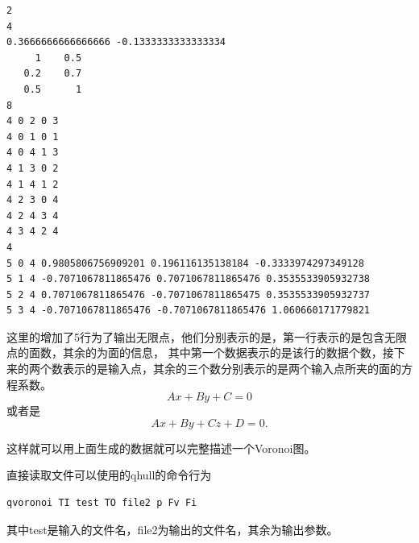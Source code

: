 \begin{verbatim}
2
4
0.3666666666666666 -0.1333333333333334 
     1    0.5 
   0.2    0.7 
   0.5      1 
8
4 0 2 0 3
4 0 1 0 1
4 0 4 1 3
4 1 3 0 2
4 1 4 1 2
4 2 3 0 4
4 2 4 3 4
4 3 4 2 4
4
5 0 4 0.9805806756909201 0.196116135138184 -0.3333974297349128 
5 1 4 -0.7071067811865476 0.7071067811865476 0.3535533905932738 
5 2 4 0.7071067811865476 -0.7071067811865475 0.3535533905932737 
5 3 4 -0.7071067811865476 -0.7071067811865476 1.060660171779821
\end{verbatim}

这里的增加了5行为了输出无限点，他们分别表示的是，第一行表示的是包含无限点的面数，其余的为面的信息，
其中第一个数据表示的是该行的数据个数，接下来的两个数表示的是输入点，其余的三个数分别表示的是两个输入点所夹的面的方程系数。
\[Ax+By+C=0\]
或者是
\[
Ax+By+Cz+D=0.
\]

这样就可以用上面生成的数据就可以完整描述一个Voronoi图。

直接读取文件可以使用的qhull的命令行为
\begin{verbatim}
qvoronoi TI test TO file2 p Fv Fi
\end{verbatim}
其中test是输入的文件名，file2为输出的文件名，其余为输出参数。


\newpage
